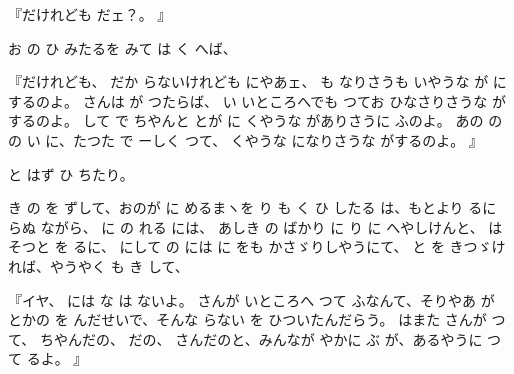 
『だけれども
だェ？。
』

お
の
ひ
みたるを
みて
は
く
へば、

『だけれども、
だか
らないけれども
にやあェ、
も
なりさうも
いやうな
が
にするのよ。
さんは
が
つたらば、
い
いところへでも
つてお
ひなさりさうな
がするのよ。
して
で
ちやんと
とが
に
くやうな
がありさうに
ふのよ。
あの
の
の
い
に、たつた
で
ーしく
つて、
くやうな
になりさうな
がするのよ。
』

と
はず
ひ
ちたり。

き
の
を
ずして、おのが
に
めるまヽを
り
も
く
ひ
したる
は、もとより
るに
らぬ
ながら、
に
の
れる
には、
あしき
の
ばかり
に
り
に
へやしけんと、
はそつと
を
るに、
にして
の
には
に
をも
かさゞりしやうにて、
と
を
きつゞけ
れば、やうやく
も
き
して、

『イヤ、
には
な
は
ないよ。
さんが
いところへ
つて
ふなんて、そりやあ
が
とかの
を
んだせいで、そんな
らない
を
ひついたんだらう。
はまた
さんが
つて、
ちやんだの、
だの、
さんだのと、みんなが
やかに
ぶ
が、あるやうに
つて
るよ。
』

